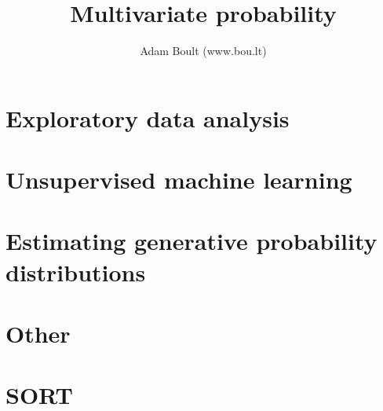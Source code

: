 \documentclass[oneside]{book}
\begin{document}
\author{Adam Boult (www.bou.lt)}
\title{Multivariate probability}
\maketitle

\setcounter{tocdepth}{0}
\tableofcontents



\part{Exploratory data analysis}




\part{Unsupervised machine learning}



\part{Estimating generative probability distributions}



\part{Other}


\part{SORT}

\end{document}
